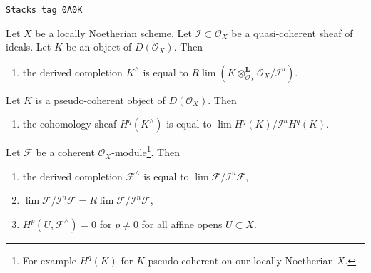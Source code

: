 \begin{lemma}
\label{algebraization-lemma-derived-completion-pseudo-coherent}
\href{https://stacks.math.columbia.edu/tag/0A0K}{\texttt{Stacks tag 0A0K}}

Let $X$ be a locally Noetherian scheme. Let $\mathcal{I} \subset \mathcal{O}_X$
be a quasi-coherent sheaf of ideals.
Let $K$ be an object of $D(\mathcal{O}_X)$. Then
\begin{enumerate}
\item the derived completion $K^\wedge$ is equal to
$R\lim (K \otimes_{\mathcal{O}_X}^\mathbf{L} \mathcal{O}_X/\mathcal{I}^n)$.
\end{enumerate}
Let $K$ is a pseudo-coherent object of $D(\mathcal{O}_X)$. Then
\begin{enumerate}
\item[(2)] the cohomology sheaf $H^q(K^\wedge)$ is equal to
$\lim H^q(K)/\mathcal{I}^nH^q(K)$.
\end{enumerate}
Let $\mathcal{F}$ be a coherent $\mathcal{O}_X$-module\footnote{For example
$H^q(K)$ for $K$ pseudo-coherent on our locally Noetherian $X$.}. Then
\begin{enumerate}
\item[(3)] the derived completion $\mathcal{F}^\wedge$ is equal to
$\lim \mathcal{F}/\mathcal{I}^n\mathcal{F}$,
\item[(4)]
$\lim \mathcal{F}/\mathcal{I}^n \mathcal{F} =
R\lim \mathcal{F}/\mathcal{I}^n \mathcal{F}$,
\item[(5)] $H^p(U, \mathcal{F}^\wedge) = 0$ for $p \not = 0$ for all
affine opens $U \subset X$.
\end{enumerate}
\end{lemma}

